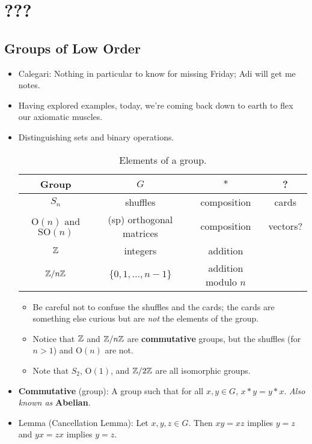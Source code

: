 \documentclass[../notes.tex]{subfiles}
\begin{document}
\chapter{???}
\section{Groups of Low Order}
\begin{itemize}
    \item {}Calegari: Nothing in particular to know for missing Friday; Adi will get me notes.
    \item Having explored examples, today, we're coming back down to earth to flex our axiomatic muscles.
    \item Distinguishing sets and binary operations.
    \begin{table}[h!]
        \centering
        \small
        \renewcommand{\arraystretch}{1.2}
        \begin{tabular}{c|c|c|c}
            Group & $G$ & $*$ & ?\\
            \hline
            $S_n$ & shuffles & composition & cards\\
            $\text{O}(n)$ and $\text{SO}(n)$ & (sp) orthogonal matrices & composition & vectors?\\
            $\mathbb{Z}$ & integers & addition\\
            $\mathbb{Z}/n\mathbb{Z}$ & $\{0,1,\dots,n-1\}$ & addition modulo $n$
        \end{tabular}
        \caption{Elements of a group.}
        \label{tab:setsBinaryops}
    \end{table}
    \begin{itemize}
        \item Be careful not to confuse the shuffles and the cards; the cards are something else curious but are \emph{not} the elements of the group.
        \item Notice that $\mathbb{Z}$ and $\mathbb{Z}/n\mathbb{Z}$ are \textbf{commutative} groups, but the shuffles (for $n>1$) and $\text{O}(n)$ are not.
        \item Note that $S_2$, $\text{O}(1)$, and $\mathbb{Z}/2\mathbb{Z}$ are all isomorphic groups.
    \end{itemize}
    \item \textbf{Commutative} (group): A group such that for all $x,y\in G$, $x*y=y*x$. \emph{Also known as} \textbf{Abelian}.
    \item Lemma (Cancellation Lemma): Let $x,y,z\in G$. Then $xy=xz$ implies $y=z$ and $yx=zx$ implies $y=z$.

\end{itemize}
\end{document}
